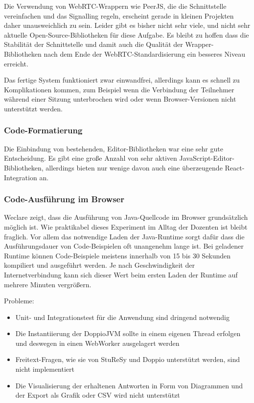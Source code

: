 Die Verwendung von WebRTC-Wrappern wie PeerJS, die die Schnittstelle vereinfachen und das Signalling regeln, erscheint gerade in kleinen Projekten daher unausweichlich zu sein. Leider gibt es bisher nicht sehr viele, und nicht sehr aktuelle Open-Source-Bibliotheken für diese Aufgabe. Es bleibt zu hoffen dass die Stabilität der Schnittstelle und damit auch die Qualität der Wrapper-Bibliotheken nach dem Ende der WebRTC-Standardisierung ein besseres Niveau erreicht.

Das fertige System funktioniert zwar einwandfrei, allerdings kann es schnell zu Komplikationen kommen, zum Beispiel wenn die Verbindung der Teilnehmer während einer Sitzung unterbrochen wird oder wenn Browser-Versionen nicht unterstützt werden.

\subsubsection*{Code-Formatierung}
Die Einbindung von bestehenden, Editor-Bibliotheken war eine sehr gute Entscheidung. Es gibt eine große Anzahl von sehr aktiven JavaScript-Editor-Bibliotheken, allerdings bieten nur wenige davon auch eine überzeugende React-Integration an.

\subsubsection*{Code-Ausführung im Browser}
Weclare zeigt, dass die Ausführung von Java-Quellcode im Browser grundsätzlich möglich ist. Wie praktikabel dieses Experiment im Alltag der Dozenten ist bleibt fraglich. Vor allem das notwendige Laden der Java-Runtime sorgt dafür dass die Ausführungsdauer von Code-Beispielen oft unangenehm lange ist. Bei geladener Runtime können Code-Beispiele meistens innerhalb von 15 bis 30 Sekunden kompiliert und ausgeführt werden. Je nach Geschwindigkeit der Internetverbindung kann sich dieser Wert beim ersten Laden der Runtime auf mehrere Minuten vergrößern.

Probleme:
\begin{itemize}
    \item Unit- und Integrationstest für die Anwendung sind dringend notwendig
    \item Die Instantiierung der DoppioJVM sollte in einem eigenen Thread erfolgen und deswegen in einen WebWorker ausgelagert werden
    \item Freitext-Fragen, wie sie von StuReSy und Doppio unterstützt werden, sind nicht implementiert
    \item Die Visualisierung der erhaltenen Antworten in Form von Diagrammen und der Export als Grafik oder CSV wird nicht unterstützt
\end{itemize}




